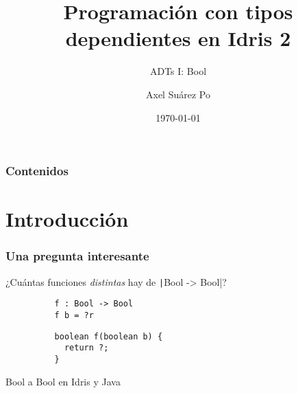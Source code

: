 \documentclass{beamer}
\title{Programación con tipos dependientes en Idris 2}
\subtitle{ADTs I: Bool}
\author{Axel Suárez Po}
\institute{BUAP}
\date{\today}
\begin{document}
\begin{frame}
  \titlepage
\end{frame}

\begin{frame}[t]
  \frametitle{Contenidos}
  \tableofcontents
\end{frame}

\section{Introducción}

\begin{frame}[fragile]
  \frametitle{Una pregunta interesante}

  \Large{¿Cuántas funciones \emph{distintas} hay de \texttt|Bool -> Bool|?}
  \vspace{10pt}

  \begin{listing}[H]
    \begin{center}
      \begin{minipage}{0.35\textwidth}
          \begin{verbatim}
          f : Bool -> Bool
          f b = ?r

          \end{verbatim}
      \end{minipage}
      \hspace{-0.05\textwidth}
      \vrule
      \hspace{0.025\textwidth}
      \begin{minipage}{0.35\textwidth}
          \begin{verbatim}
          boolean f(boolean b) {
            return ?;
          }
          \end{verbatim}
      \end{minipage}
    \end{center}
    \caption{Bool a Bool en Idris y Java}
    \label{lst:btobIdrisJava}
  \end{listing}


\end{frame}
\end{document}
